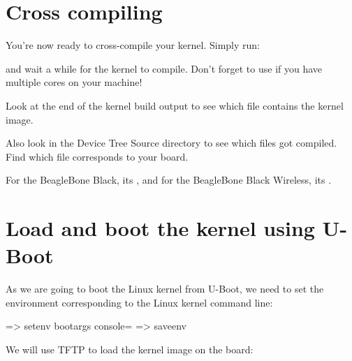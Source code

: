 
\section{Cross compiling}

You're now ready to cross-compile your kernel. Simply run:


and wait a while for the kernel to compile. Don't forget to use
 if you have multiple cores on your machine!

Look at the end of the kernel build output to see which file contains
the kernel image.

Also look in the Device Tree Source directory to see which 
files got compiled. Find which  file corresponds to your board.

{For the BeagleBone Black, its ,
and for the BeagleBone Black Wireless, its
.}
{}

\section{Load and boot the kernel using U-Boot}

As we are going to boot the Linux kernel from U-Boot,
we need to set the  environment corresponding
to the Linux kernel command line:

\begin{ubootinput}
=> setenv bootargs console=%
=> saveenv
\end{ubootinput}
We will use TFTP to load the kernel image on the board:

